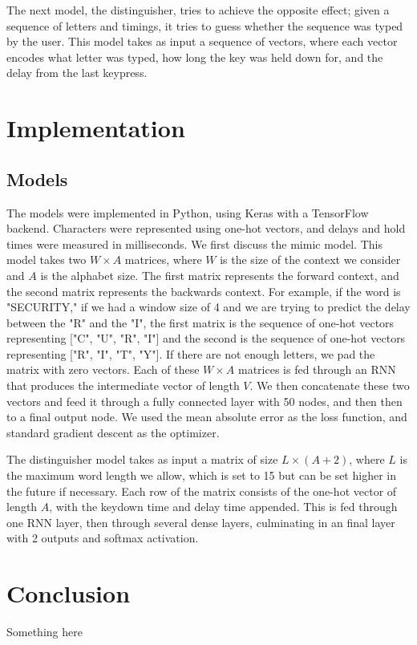 \documentclass{amsart}
\begin{document}
\begin{multicols*}{2}
The next model, the distinguisher, tries to achieve the opposite effect; given a sequence of letters and timings, it tries to guess whether the sequence was typed by the user. This model takes as input a sequence of vectors, where each vector encodes what letter was typed, how long the key was held down for, and the delay from the last keypress.



\section{Implementation}


\subsection{Models}
The models were implemented in Python, using Keras with a TensorFlow backend. Characters were represented using one-hot vectors, and delays and hold times were measured in milliseconds. We first discuss the mimic model. This model takes two $W \times A$ matrices, where $W$ is the size of the context we consider and $A$ is the alphabet size. The first matrix represents the forward context, and the second matrix represents the backwards context. For example, if the word is "SECURITY," if we had a window size of 4 and we are trying to predict the delay between the "R" and the "I", the first matrix is the sequence of one-hot vectors representing ["C", "U", "R", "I"] and the second is the sequence of one-hot vectors representing ["R", "I", "T", "Y"]. If there are not enough letters, we pad the matrix with zero vectors. Each of these $W \times A$ matrices is fed through an RNN that produces the intermediate vector of length $V$. We then concatenate these two vectors and feed it through a fully connected layer with 50 nodes, and then then to a final output node. We used the mean absolute error as the loss function, and standard gradient descent as the optimizer.

The distinguisher model takes as input a matrix of size $L \times (A + 2)$, where $L$ is the maximum word length we allow, which is set to 15 but can be set higher in the future if necessary. Each row of the matrix consists of the one-hot vector of length $A$, with the keydown time and delay time appended. This is fed through one RNN layer, then through several dense layers, culminating in an final layer with 2 outputs and softmax activation.







\section{Conclusion}
Something here


\end{multicols*}
\end{document}
